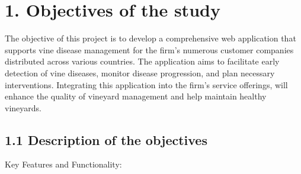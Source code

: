 \section{1. Objectives of the study}
The objective of this project is to develop a comprehensive web application that supports vine disease management for the firm's numerous customer companies distributed across various countries. The application aims to facilitate early detection of vine diseases, monitor disease progression, and plan necessary interventions. Integrating this application into the firm's service offerings, will enhance the quality of vineyard management and help maintain healthy vineyards.\\

\subsection{1.1 Description of the objectives}
Key Features and Functionality:
